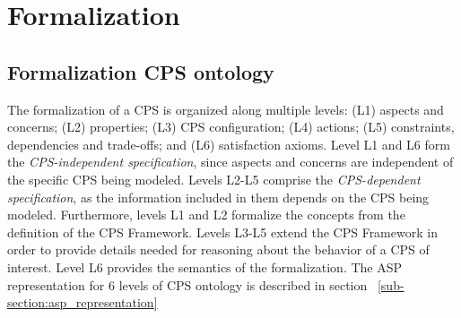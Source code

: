 \section{Formalization}


\subsection{Formalization CPS ontology}
\label{for:CPS_ontology}
The formalization of a CPS is organized along multiple levels: (L1) aspects and concerns; (L2) properties; (L3) CPS configuration; (L4) actions; (L5) constraints, dependencies and trade-offs; and (L6) satisfaction axioms. Level L1 and L6 form the \emph{CPS-independent specification}, since aspects and concerns are independent of the specific CPS being modeled. Levels L2-L5 comprise the \emph{CPS-dependent specification}, as the information included in them depends on the CPS being modeled. Furthermore, levels L1 and L2 formalize the concepts from the definition of the CPS Framework. Levels L3-L5 extend the CPS Framework in order to provide details needed for reasoning about the behavior of a CPS of interest. Level L6 provides the semantics of the formalization. The ASP representation for 6 levels of CPS ontology is described in section ~\ref{sub-section:asp_representation}

